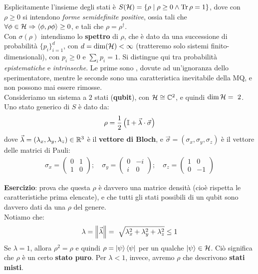 \documentclass[../../InformazioneQuantistica.tex]{subfiles}
\begin{document}
Esplicitamente l'insieme degli stati è $S(\mathcal{H}) = \{\rho \mid \rho \geq 0 \land \operatorname{Tr} \rho = 1\}$, dove con $\rho \geq 0$ si intendono \textit{forme semidefinite positive}, ossia tali che $\forall \phi \in \mathcal{H} \Rightarrow  \Braket{\phi, \rho \phi} \geq 0$, e tali che $\rho = \rho^\dag$.\\
Con $\sigma(\rho)$ intendiamo lo \textbf{spettro} di $\rho$, che è dato da una successione di probabilità $\{p_i\}_{i=1}^d$, con $d=\operatorname{dim}(\mathcal{H})<\infty$ (tratteremo solo sistemi finito-dimensionali), con $p_i \geq 0$ e $\sum_i p_i = 1$. Si distingue qui tra probabilità \textit{epistematiche} e \textit{intrinseche}. Le prime sono , dovute ad un'ignoranza dello sperimentatore, mentre le seconde sono una caratteristica inevitabile della MQ, e non possono mai essere rimosse.\\

Consideriamo un sistema a $2$ stati (\textbf{qubit}), con $\mathcal{H} \cong \mathbb{C}^2$, e quindi $\op{dim}\hs =\ 2$. Uno stato generico di $S$ è dato da:
\begin{align*}
\rho = \frac{1}{2} \left( \mathbb{I} + \vec{\lambda} \cdot \vec{\sigma} \right) 
\end{align*} 
dove $\vec{\lambda} = (\lambda_x, \lambda_y, \lambda_z) \in \mathbb{R}^3$ è il \textbf{vettore di Bloch}, e $\vec{\sigma} = (\sigma_x, \sigma_y, \sigma_z)$ è il vettore delle matrici di Pauli:
\begin{align*}
\sigma_x = \begin{pmatrix}0 & 1\\ 1 & 0\end{pmatrix}; \quad \sigma_y = \begin{pmatrix} 0 & -i\\ i & 0 \end{pmatrix}; \quad \sigma_z = \begin{pmatrix}1 & 0 \\ 0 & -1\end{pmatrix}
\end{align*}

\textbf{Esercizio}: prova che questa $\rho$ è davvero una matrice densità (cioè rispetta le caratteristiche prima elencate), e che tutti gli stati possibili di un qubit sono davvero dati da una $\rho$ del genere.\\


Notiamo che:
\begin{align*}
\lambda = \left\lVert\vec{\lambda}\right\rVert =\ \sqrt{\lambda_x^2 + \lambda_y^2 +\lambda_z^2 } \leq 1
\end{align*}
Se $\lambda=1$, allora $\rho^2 = \rho$ e quindi $\rho=\Ket{\psi}\Bra{\psi}$ per un qualche $\Ket{\psi}\in \mathcal{H}$. Ciò significa che $\rho$ è un certo \textbf{stato puro}. Per $\lambda < 1$, invece, avremo $\rho$ che descrivono \textbf{stati misti}.\\
\end{document}
